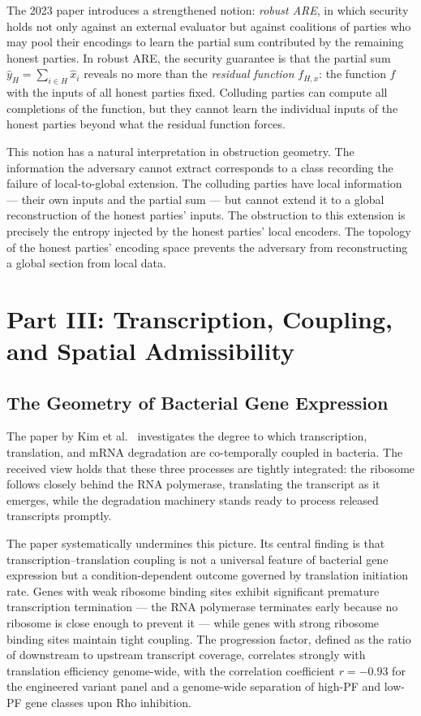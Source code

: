 \documentclass[12pt, a4paper]{article}
\theoremstyle{essaystyle}
\begin{document}
The 2023 paper introduces a strengthened notion: \emph{robust ARE}, in which security
holds not only against an external evaluator but against coalitions of parties who may
pool their encodings to learn the partial sum contributed by the remaining honest
parties. In robust ARE, the security guarantee is that the partial sum
$\hat{y}_H = \sum_{i \in H} \hat{x}_i$ reveals no more than the \emph{residual
function} $f_{H,x}$: the function $f$ with the inputs of all honest parties fixed.
Colluding parties can compute all completions of the function, but they cannot learn
the individual inputs of the honest parties beyond what the residual function forces.

This notion has a natural interpretation in obstruction geometry. The information the
adversary cannot extract corresponds to a class recording the failure of local-to-global
extension. The colluding parties have local information --- their own inputs and the
partial sum --- but cannot extend it to a global reconstruction of the honest parties'
inputs. The obstruction to this extension is precisely the entropy injected by the
honest parties' local encoders. The topology of the honest parties' encoding space
prevents the adversary from reconstructing a global section from local data.

\section{Part III: Transcription, Coupling, and Spatial Admissibility}

\subsection{The Geometry of Bacterial Gene Expression}

The paper by Kim et al.\ \citep{kim2026spatial} investigates the degree to which
transcription, translation, and mRNA degradation are co-temporally coupled in bacteria.
The received view holds that these three processes are tightly integrated: the ribosome
follows closely behind the RNA polymerase, translating the transcript as it emerges,
while the degradation machinery stands ready to process released transcripts promptly.

The paper systematically undermines this picture. Its central finding is that
transcription--translation coupling is not a universal feature of bacterial gene
expression but a condition-dependent outcome governed by translation initiation rate.
Genes with weak ribosome binding sites exhibit significant premature transcription
termination --- the RNA polymerase terminates early because no ribosome is close enough
to prevent it --- while genes with strong ribosome binding sites maintain tight
coupling. The progression factor, defined as the ratio of downstream to upstream
transcript coverage, correlates strongly with translation efficiency genome-wide,
with the correlation coefficient $r = -0.93$ for the engineered variant panel and
a genome-wide separation of high-PF and low-PF gene classes upon Rho inhibition.
\end{document}

